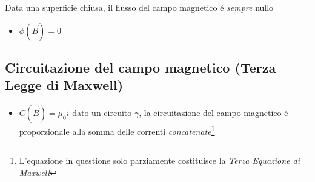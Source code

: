 \documentclass[17pt]{extarticle}
\begin{document}
Data una superficie chiusa, il flusso del campo magnetico \'e \emph{sempre} nullo
\begin{itemize}
	\item $\phi(\vec{B}) = 0$
\end{itemize}


\subsection{Circuitazione del campo magnetico (Terza Legge di Maxwell)}

\begin{itemize}
	\item $C(\vec{B}) = \mu_0 i$ dato un circuito $\gamma$, la circuitazione del campo magnetico \'e proporzionale alla somma delle correnti \emph{concatenate}\footnote{L'equazione in questione solo parziamente costituisce la \emph{Terza Equazione di Maxwell}}
\end{itemize}
\end{document}
